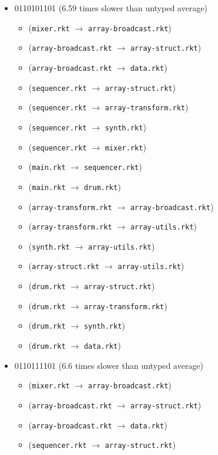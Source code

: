 \documentclass{article}
\newcommand{\mono}[1]{\texttt{#1}}
\begin{document}
\begin{itemize}
\begin{itemize}
  \end{itemize}
\item 0110101101 (6.59 times slower than untyped average)
  \begin{itemize}
  \item (\mono{mixer.rkt} $\rightarrow$ \mono{array-broadcast.rkt})
  \item (\mono{array-broadcast.rkt} $\rightarrow$ \mono{array-struct.rkt})
  \item (\mono{array-broadcast.rkt} $\rightarrow$ \mono{data.rkt})
  \item (\mono{sequencer.rkt} $\rightarrow$ \mono{array-struct.rkt})
  \item (\mono{sequencer.rkt} $\rightarrow$ \mono{array-transform.rkt})
  \item (\mono{sequencer.rkt} $\rightarrow$ \mono{synth.rkt})
  \item (\mono{sequencer.rkt} $\rightarrow$ \mono{mixer.rkt})
  \item (\mono{main.rkt} $\rightarrow$ \mono{sequencer.rkt})
  \item (\mono{main.rkt} $\rightarrow$ \mono{drum.rkt})
  \item (\mono{array-transform.rkt} $\rightarrow$ \mono{array-broadcast.rkt})
  \item (\mono{array-transform.rkt} $\rightarrow$ \mono{array-utils.rkt})
  \item (\mono{synth.rkt} $\rightarrow$ \mono{array-utils.rkt})
  \item (\mono{array-struct.rkt} $\rightarrow$ \mono{array-utils.rkt})
  \item (\mono{drum.rkt} $\rightarrow$ \mono{array-struct.rkt})
  \item (\mono{drum.rkt} $\rightarrow$ \mono{array-transform.rkt})
  \item (\mono{drum.rkt} $\rightarrow$ \mono{synth.rkt})
  \item (\mono{drum.rkt} $\rightarrow$ \mono{data.rkt})
  \end{itemize}
\item 0110111101 (6.6 times slower than untyped average)
  \begin{itemize}
  \item (\mono{mixer.rkt} $\rightarrow$ \mono{array-broadcast.rkt})
  \item (\mono{array-broadcast.rkt} $\rightarrow$ \mono{array-struct.rkt})
  \item (\mono{array-broadcast.rkt} $\rightarrow$ \mono{data.rkt})
  \item (\mono{sequencer.rkt} $\rightarrow$ \mono{array-struct.rkt})

\end{itemize}
\end{itemize}
\end{document}
